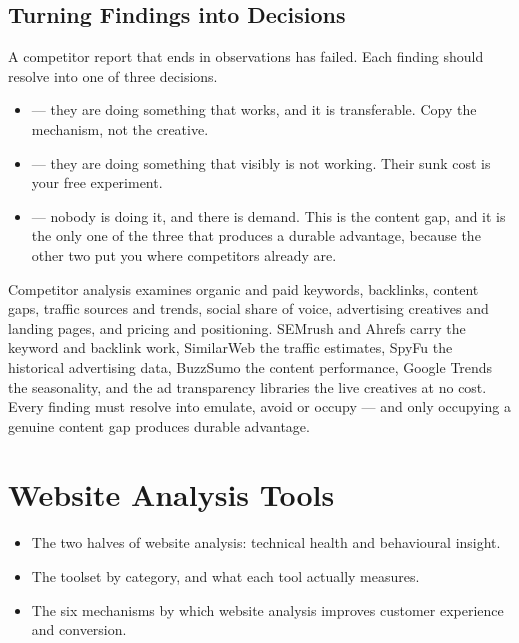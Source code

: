 \documentclass{MMTextbook}
\begin{document}
\section{Turning Findings into Decisions}

A competitor report that ends in observations has failed. Each finding should
resolve into one of three decisions.

\begin{itemize}
\item {} --- they are doing something that works, and it is
      transferable. Copy the mechanism, not the creative.
\item {} --- they are doing something that visibly is not working.
      Their sunk cost is your free experiment.
\item {} --- nobody is doing it, and there is demand. This is the
      content gap, and it is the only one of the three that produces a durable
      advantage, because the other two put you where competitors already are.
\end{itemize}

\begin{summarybox}
Competitor analysis examines organic and paid keywords, backlinks, content gaps,
traffic sources and trends, social share of voice, advertising creatives and
landing pages, and pricing and positioning. SEMrush and Ahrefs carry the
keyword and backlink work, SimilarWeb the traffic estimates, SpyFu the
historical advertising data, BuzzSumo the content performance, Google Trends the
seasonality, and the ad transparency libraries the live creatives at no cost.
Every finding must resolve into emulate, avoid or occupy --- and only occupying
a genuine content gap produces durable advantage.
\end{summarybox}

\chapter{Website Analysis Tools}


\begin{learningoutcomes}
\begin{itemize}
\item The two halves of website analysis: technical health and behavioural
      insight.
\item The toolset by category, and what each tool actually measures.
\item The six mechanisms by which website analysis improves customer experience
      and conversion.
\end{itemize}
\end{learningoutcomes}
\end{document}
